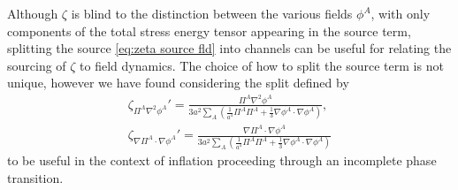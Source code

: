 


Although $\zeta$ is blind to the distinction between the various fields $\phi^A$, with only components of the total stress energy tensor appearing in the source term, splitting the source \eqref{eq:zeta source fld} into channels can be useful for relating the sourcing of $\zeta$ to field dynamics. The choice of how to split the source term is not unique, however we have found considering the split defined by
\begin{align}
  \zeta_{\Pi^A\nabla^2\phi^A}' = \frac{\Pi^A\nabla^2\phi^A}{3a^2\sum_A\left(\frac{1}{a^4}\Pi^A\Pi^A + \frac{1}{3}\nabla\phi^A\cdot\nabla\phi^A \right)}, \label{eq:zeta source lap}\\
  \zeta_{\nabla\Pi^A\cdot\nabla\phi^A}' = \frac{\nabla\Pi^A\cdot\nabla\phi^A}{3a^2\sum_A\left(\frac{1}{a^4}\Pi^A\Pi^A + \frac{1}{3}\nabla\phi^A\cdot\nabla\phi^A \right)} \label{eq:zeta source gdg}
\end{align}
to be useful in the context of inflation proceeding through an incomplete phase transition.

